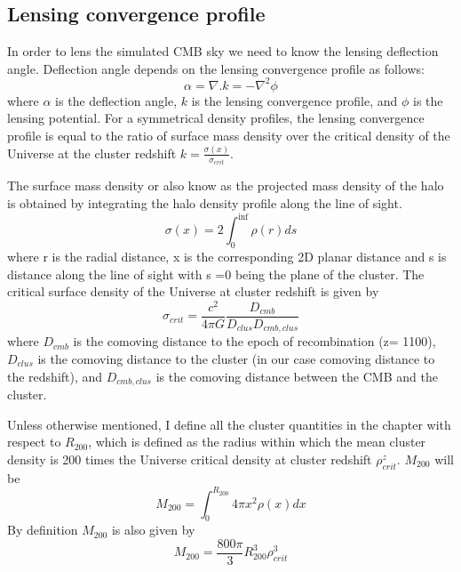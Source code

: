   \subsection{Lensing convergence profile}
  In order to lens the simulated CMB sky we need to know the lensing deflection angle.
  Deflection angle depends on the lensing convergence profile as follows:
\begin{equation}
 \alpha = \nabla. k = -\nabla^{2} \phi
 \end{equation}
 where $\alpha$ is the deflection angle, $k$ is the lensing convergence profile, and $\phi$ is the lensing potential.
 For a symmetrical density profiles, the lensing convergence profile is equal to the ratio of surface mass density over the critical density of the Universe at the cluster redshift $k = \frac{\sigma(x)}{\sigma_{crit}}$.
 
The surface mass density or also know as the projected mass density of the halo is obtained by integrating the halo density profile along the line of sight. 
 \begin{equation}
 \sigma(x) = 2 \int^{\inf}_{0} \rho(r) ds
 \label{eq:surface_density}
 \end{equation}
 where r is the radial distance, x is the corresponding 2D planar distance and s is distance along the line of sight with s =0 being the plane of the cluster.
 The critical surface density of the Universe at cluster redshift is given by
 \begin{equation}
 \sigma_{crit} = \frac{c^{2}}{4\pi G} \frac{D_{cmb}}{D_{clus}D_{cmb,clus}}
 \end{equation}
 where $D_{cmb}$ is the comoving distance to the epoch of recombination (z= 1100), $D_{clus}$ is the comoving distance to the cluster (in our case comoving distance to the redshift), and $D_{cmb,clus}$ is the comoving distance between the CMB and the cluster.
 
 Unless otherwise mentioned, I define all the cluster quantities in the chapter with respect to $R_{200}$, which is defined as the radius within which the mean cluster density is 200 times the Universe critical density at cluster redshift $\rho^{z}_{crit}$. $M_{200}$ will be 
 \begin{equation}
 M_{200} = \int^{R_{200}}_{0}  4\pi x^{2} \rho(x) dx
 \end{equation}
 By definition $M_{200}$ is also given by
 \begin{equation}
 M_{200} = \frac{800\pi}{3} R^{3}_{200} \rho^{3}_{crit}
 \end{equation}
 
